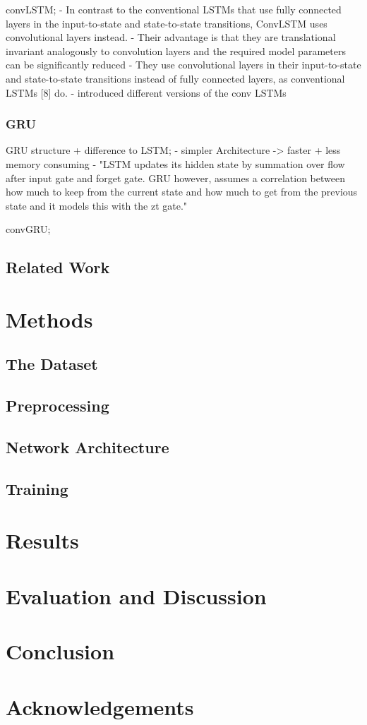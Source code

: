 \documentclass[11pt,
  paper=a4, 
  bibliography=totocnumbered,
	captions=tableheading,
	BCOR=10mm
]{scrreprt}
\theoremstyle{definition}
\begin{document}
convLSTM;
- In contrast to the conventional LSTMs that use fully connected layers in the input-to-state and state-to-state transitions, ConvLSTM uses convolutional layers instead. \cite{Nabavi2018}
- Their advantage is that they are translational invariant analogously to convolution layers and the required model parameters can be significantly reduced \cite{Pfeuffer2_2019}
- They use convolutional layers in their input-to-state and state-to-state transitions instead of fully connected layers, as conventional LSTMs [8] do. \cite{Pfeuffer2_2019}
- \cite{Pfeuffer2_2019} introduced different versions of the conv LSTMs



\subsection{GRU}
GRU structure + difference to LSTM;
- simpler Architecture -> faster + less memory consuming \cite{Valipour2017}
- "LSTM updates its hidden state by summation over flow after input gate and forget gate.
   GRU however, assumes a correlation between how much to keep from the current state and 
   how much to get from the previous state and it models this with the zt gate." \cite{Valipour2017}


convGRU;

\section{Related Work}
\chapter{Methods}
\section{The Dataset}
\section{Preprocessing}
\section{Network Architecture}
\section{Training}
\chapter{Results}
\chapter{Evaluation and Discussion}
\chapter{Conclusion}


\chapter*{Acknowledgements}






\glsaddall
\printglossaries

\printbibliography
\end{document}
